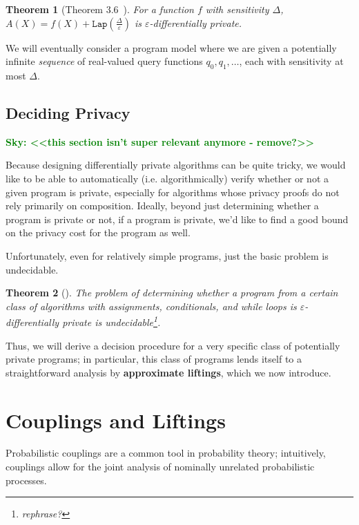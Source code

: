 \documentclass[12pt]{article}
\newcommand{\Lap}{\texttt{Lap}}
\newcommand{\todo}[2]{\textcolor{#1}{\textbf{#2}}}
\newcommand{\sky}[1]{\todo{green}{Sky: <<#1>>}}
\newtheorem{thm}{Theorem}[section]
\theoremstyle{definition}
\begin{document}
\begin{thm}[Theorem 3.6~\cite{dworkrothmonograph}]
    For a function $f$ with sensitivity $\Delta$, $A(X) = f(X) + \Lap(\frac{\Delta}{\varepsilon})$ is $\varepsilon$-differentially private. 
\end{thm}

We will eventually consider a program model where we are given a potentially infinite \textit{sequence} of real-valued query functions $q_0, q_1, \ldots$, each with sensitivity at most $\Delta$.

\subsection{Deciding Privacy}

\sky{this section isn't super relevant anymore - remove?}

Because designing differentially private algorithms can be quite tricky, we would like to be able to automatically (i.e. algorithmically) verify whether or not a given program is private, especially for algorithms whose privacy proofs do not rely primarily on composition. 
Ideally, beyond just determining whether a program is private or not, if a program is private, we'd like to find a good bound on the privacy cost for the program as well. 

Unfortunately, even for relatively simple programs, just the basic problem is undecidable. 

\begin{thm}[\cite{barthe.etal2020decidingdp}]
    The problem of determining whether a program from a certain class of algorithms with assignments, conditionals, and while loops is $\varepsilon$-differentially private is undecidable\footnote{rephrase?}.
\end{thm}

Thus, we will derive a decision procedure for a very specific class of potentially private programs; in particular, this class of programs lends itself to a straightforward analysis by \textbf{approximate liftings}, which we now introduce. 

\section{Couplings and Liftings}

Probabilistic couplings are a common tool in probability theory; intuitively, couplings allow for the joint analysis of nominally unrelated probabilistic processes. 
\end{document}
